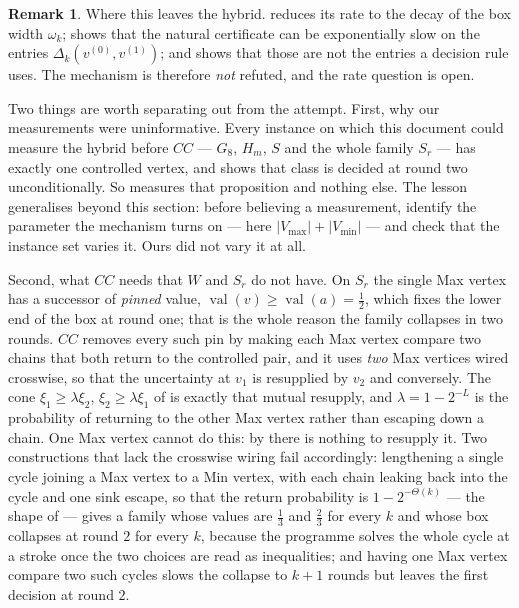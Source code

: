 \documentclass[11pt]{article}
\theoremstyle{plain}
\theoremstyle{definition}
\newtheorem{remark}[theorem]{Remark}
\DeclareMathOperator{\val}{val}
\newcommand{\Vmax}{V_{\max}}
\newcommand{\Vmin}{V_{\min}}
\begin{document}
\begin{remark}\label{rem:hybrid-rate}
Where this leaves the hybrid.  reduces its rate to the
decay of the box width $\omega_k$;  shows that the
natural certificate can be exponentially slow on the entries
$\Delta_k(v^{(0)},v^{(1)})$; and  shows
that those are not the entries a decision rule uses. The mechanism is therefore
\emph{not} refuted, and the rate question is open.

Two things are worth separating out from the attempt. First, why our
measurements were uninformative. Every instance on which this document could
measure the hybrid before $CC$ --- $G_8$, $H_m$, $S$ and the whole family $S_r$
--- has exactly one controlled vertex, and  shows that
class is decided at round two unconditionally. So
 measures that proposition and nothing else. The
lesson generalises beyond this section: before believing a measurement, identify
the parameter the mechanism turns on --- here $|\Vmax|+|\Vmin|$ --- and check
that the instance set varies it. Ours did not vary it at all.

Second, what $CC$ needs that $W$ and $S_r$ do not have. On $S_r$ the single Max
vertex has a successor of \emph{pinned} value, $\val(v)\ge\val(a)=\tfrac12$,
which fixes the lower end of the box at round one; that is the whole reason the
family collapses in two rounds. $CC$ removes every such pin by making each Max
vertex compare two chains that both return to the controlled pair, and it uses
\emph{two} Max vertices wired crosswise, so that the uncertainty at $v_1$ is
resupplied by $v_2$ and conversely. The cone $\xi_1\ge\lambda\xi_2$,
$\xi_2\ge\lambda\xi_1$ of  is exactly that mutual
resupply, and $\lambda=1-2^{-L}$ is the probability of returning to the other
Max vertex rather than escaping down a chain. One Max vertex cannot do this: by
 there is nothing to resupply it. Two constructions
that lack the crosswise wiring fail accordingly: lengthening a single cycle
joining a Max vertex to a Min vertex, with each chain leaking back into the
cycle and one sink escape, so that the return probability is
$1-2^{-\Theta(k)}$ --- the shape of  --- gives a family whose
values are $\tfrac13$ and $\tfrac23$ for every $k$ and whose box collapses at
round $2$ for every $k$, because the programme solves the whole cycle at a
stroke once the two choices are read as inequalities; and having one Max vertex
compare two such cycles slows the collapse to $k+1$ rounds but leaves the first
decision at round $2$.


\end{remark}
\end{document}
